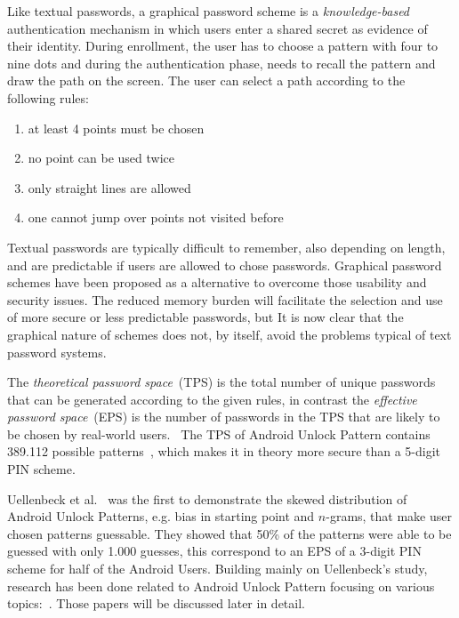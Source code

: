 \documentclass[twocolumn, a4paper, 10pt]{article}
\begin{document}
Like textual passwords, a graphical password scheme is a \textit{knowledge-based} authentication mechanism in which users enter a shared secret as evidence of their identity. During enrollment, the user has to choose a pattern with four to nine dots and during the authentication phase, needs to recall the pattern and draw the path on the screen. The user can select a path according to the following rules:

\begin{enumerate}
	\item at least 4 points must be chosen
	\item no point can be used twice
	\item only straight lines are allowed
	\item one cannot jump over points not visited before
\end{enumerate}

Textual passwords are typically difficult to remember, also depending on length, and are predictable if users are allowed to chose passwords. Graphical password schemes have been proposed as a alternative to overcome those usability and security issues. The reduced memory burden will facilitate the selection and use of more secure or less predictable passwords, but It is now clear that the graphical nature of schemes does not, by itself, avoid the problems typical of text password systems.~\cite{Biddle:2012:GPL:2333112.2333114}

The \textit{theoretical password space}~(TPS) is the total number of unique passwords that can be generated according to the given rules, in contrast the \textit{effective password space}~(EPS)  is the number of passwords in the TPS that are likely to be chosen by real-world users.~\cite{forget2007persuasion} The TPS of Android Unlock Pattern contains 389.112 possible patterns~\cite{Aviv:2010:SAS:1925004.1925009}, which makes it in theory more secure than a 5-digit PIN scheme.

Uellenbeck et al.~\cite{Uellenbeck:2013:QSG:2508859.2516700} was the first to demonstrate the skewed distribution of Android Unlock Patterns, e.g. bias in starting point and $n$-grams, that make user chosen patterns guessable. They showed that 50\% of the patterns were able to be guessed with only 1.000 guesses, this correspond to an EPS of a 3-digit PIN scheme for half of the Android Users. Building mainly on Uellenbeck's study, research has been done related to Android Unlock Pattern focusing on various topics:~\cite{Sun2014308, siadati2015fortifying, Aviv:2014:UVP:2664243.2664253, Andriotis:2013:PSS:2462096.2462098}. Those papers will be discussed later in detail.
\end{document}
